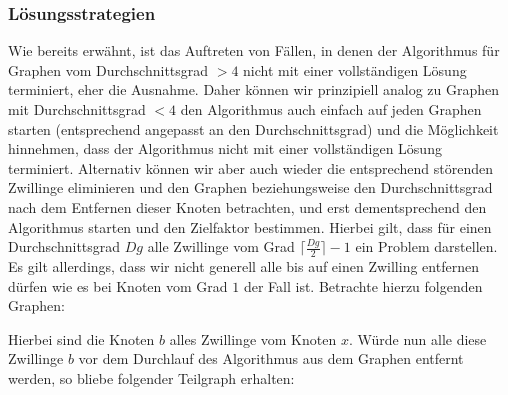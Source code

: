 \documentclass[12pt,onecolumn, notitlepage]{scrartcl}
\begin{document}
\subsubsection{Lösungsstrategien}
Wie bereits erwähnt, ist das Auftreten von Fällen, in denen der Algorithmus für Graphen vom Durchschnittsgrad $> 4$ nicht mit einer vollständigen Lösung terminiert, eher die Ausnahme. Daher können wir prinzipiell analog zu Graphen mit Durchschnittsgrad $< 4$ den Algorithmus auch einfach auf jeden Graphen starten (entsprechend angepasst an den Durchschnittsgrad) und die Möglichkeit hinnehmen, dass der Algorithmus nicht mit einer vollständigen Lösung terminiert. Alternativ können wir aber auch wieder die entsprechend störenden Zwillinge eliminieren und den Graphen beziehungsweise den Durchschnittsgrad nach dem Entfernen dieser Knoten betrachten, und erst dementsprechend den Algorithmus starten und den Zielfaktor bestimmen. Hierbei gilt, dass für einen Durchschnittsgrad $Dg$ alle Zwillinge vom Grad $\lceil \frac{Dg}{2} \rceil -1$ ein Problem darstellen. Es gilt allerdings, dass wir nicht generell alle bis auf einen Zwilling entfernen dürfen wie es bei Knoten vom Grad $1$ der Fall ist. Betrachte hierzu folgenden Graphen:\newline

\begin{center}
\end{center}

Hierbei sind die Knoten $b$ alles Zwillinge vom Knoten $x$. Würde nun alle diese Zwillinge $b$ vor dem Durchlauf des Algorithmus aus dem Graphen entfernt werden, so bliebe folgender Teilgraph erhalten:
\end{document}
